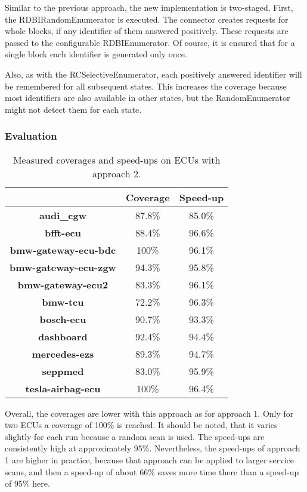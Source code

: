 Similar to the previous approach, the new implementation is two-staged. First, the RDBIRandomEnumerator is executed. The connector creates requests for whole blocks, if any identifier of them answered positively. These requests are passed to the configurable RDBIEnumerator. Of course, it is ensured that for a single block each identifier is generated only once.

Also, as with the RCSelectiveEnumerator, each positively answered identifier will be remembered for all subsequent states. This increases the coverage because most identifiers are also available in other states, but the RandomEnumerator might not detect them for each state.

\subsubsection{Evaluation}

\begin{table}[h]
    \begin{center}
    \begin{tabular}{ccc}
        \hline
        & \textbf{Coverage} & \textbf{Speed-up} \\
        \hline
        \textbf{audi\_cgw} & 87.8\% & 85.0\% \\
        \textbf{bfft-ecu} & 88.4\% & 96.6\% \\
        \textbf{bmw-gateway-ecu-bdc} & 100\% & 96.1\% \\
        \textbf{bmw-gateway-ecu-zgw} & 94.3\% & 95.8\% \\
        \textbf{bmw-gateway-ecu2} & 83.3\% & 96.1\% \\
        \textbf{bmw-tcu} & 72.2\% & 96.3\% \\
        \textbf{bosch-ecu} & 90.7\% & 93.3\% \\
        \textbf{dashboard} & 92.4\% & 94.4\% \\
        \textbf{mercedes-ezs} & 89.3\% & 94.7\% \\
        \textbf{seppmed} & 83.0\% & 95.9\% \\
        \textbf{tesla-airbag-ecu} & 100\% & 96.4\% \\
        \hline
    \end{tabular}
    \end{center}
    \caption{Measured coverages and speed-ups on ECUs with approach 2.}
    \label{tab:evaluation-approach2}
\end{table}

Overall, the coverages are lower with this approach as for approach 1. Only for two ECUs a coverage of 100\% is reached. It should be noted, that it varies slightly for each run because a random scan is used. The speed-ups are consistently high at approximately 95\%. Nevertheless, the speed-ups of approach 1 are higher in practice, because that approach can be applied to larger service scans, and then a speed-up of about 66\% saves more time there than a speed-up of 95\% here.


